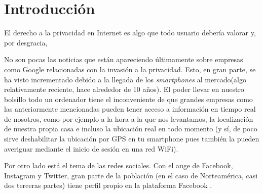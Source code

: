 \chapter{Introducción} 
\label{chap:intro}

\vspace{-0.2cm}

El derecho a la privacidad en Internet es algo que todo usuario
debería valorar y, por desgracia, 


No son pocas las noticias que están apareciendo últimamente sobre
empresas como Google relacionadas con la invasión a la
privacidad. Esto, en gran parte, se ha visto incrementado debido a la
llegada de los \textit{smartphones} al mercado(algo relativamente
reciente, hace alrededor de 10 años). El poder llevar en nuestro
bolsillo todo un ordenador tiene el inconveniente de que grandes
empresas como las anteriormente mencionadas pueden tener acceso a
información en tiempo real de nosotros, como por ejemplo a la hora a
la que nos levantamos, la localización de nuestra propia casa e
incluso la ubicación real en todo momento (y sí, de poco sirve
deshabilitar la ubicación por GPS en tu smartphone pues también la
pueden averiguar mediante el inicio de sesión en una red WiFi).

Por otro lado está el tema de las redes sociales. Con el auge de
Facebook, Instagram y Twitter, gran parte de la población (en el caso
de Norteamérica, casi dos terceras partes) tiene perfil propio en la
plataforma Facebook .

